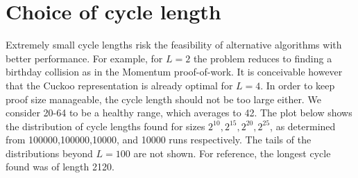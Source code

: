 \documentclass[11pt, oneside]{article}
\begin{document}
\section{Choice of cycle length}
Extremely small cycle lengths risk the feasibility of alternative algorithms with better performance.
For example, for $L=2$ the problem reduces to finding a birthday collision
as in the Momentum proof-of-work.
It is conceivable however that the Cuckoo representation is already optimal for $L=4$.
In order to keep proof size manageable, the cycle length should not be too large either.
We consider 20-64 to be a healthy range, which averages to 42.
The plot below shows the distribution of cycle lengths found for sizes $2^{10},2^{15},2^{20},2^{25}$,
as determined from 100000,100000,10000, and 10000 runs respectively. The tails of the distributions
beyond $L=100$ are not shown. For reference, the longest cycle found was of length 2120.
\end{document}
